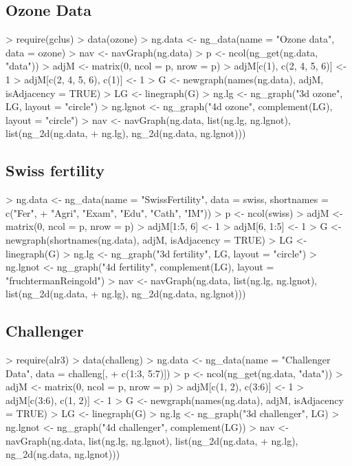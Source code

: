 \documentclass[12pt,oneside,titlepage,letter]{article}
\begin{document}
\subsection{Ozone Data}
\begin{Schunk}
\begin{Sinput}
> require(gclus)
> data(ozone)
> ng.data <- ng_data(name = "Ozone data", data = ozone)
> nav <- navGraph(ng.data)
> p <- ncol(ng_get(ng.data, "data"))
> adjM <- matrix(0, ncol = p, nrow = p)
> adjM[c(1), c(2, 4, 5, 6)] <- 1
> adjM[c(2, 4, 5, 6), c(1)] <- 1
> G <- newgraph(names(ng.data), adjM, isAdjacency = TRUE)
> LG <- linegraph(G)
> ng.lg <- ng_graph("3d ozone", LG, layout = "circle")
> ng.lgnot <- ng_graph("4d ozone", complement(LG), layout = "circle")
> nav <- navGraph(ng.data, list(ng.lg, ng.lgnot), list(ng_2d(ng.data, 
+     ng.lg), ng_2d(ng.data, ng.lgnot)))
\end{Sinput}
\end{Schunk}

\subsection{Swiss fertility}
\begin{Schunk}
\begin{Sinput}
> ng.data <- ng_data(name = "SwissFertility", data = swiss, shortnames = c("Fer", 
+     "Agri", "Exam", "Edu", "Cath", "IM"))
> p <- ncol(swiss)
> adjM <- matrix(0, ncol = p, nrow = p)
> adjM[1:5, 6] <- 1
> adjM[6, 1:5] <- 1
> G <- newgraph(shortnames(ng.data), adjM, isAdjacency = TRUE)
> LG <- linegraph(G)
> ng.lg <- ng_graph("3d fertility", LG, layout = "circle")
> ng.lgnot <- ng_graph("4d fertility", complement(LG), layout = "fruchtermanReingold")
> nav <- navGraph(ng.data, list(ng.lg, ng.lgnot), list(ng_2d(ng.data, 
+     ng.lg), ng_2d(ng.data, ng.lgnot)))
\end{Sinput}
\end{Schunk}

\subsection{Challenger}
\begin{Schunk}
\begin{Sinput}
> require(alr3)
> data(challeng)
> ng.data <- ng_data(name = "Challenger Data", data = challeng[, 
+     c(1:3, 5:7)])
> p <- ncol(ng_get(ng.data, "data"))
> adjM <- matrix(0, ncol = p, nrow = p)
> adjM[c(1, 2), c(3:6)] <- 1
> adjM[c(3:6), c(1, 2)] <- 1
> G <- newgraph(names(ng.data), adjM, isAdjacency = TRUE)
> LG <- linegraph(G)
> ng.lg <- ng_graph("3d challenger", LG)
> ng.lgnot <- ng_graph("4d challenger", complement(LG))
> nav <- navGraph(ng.data, list(ng.lg, ng.lgnot), list(ng_2d(ng.data, 
+     ng.lg), ng_2d(ng.data, ng.lgnot)))
\end{Sinput}
\end{Schunk}
\end{document}
